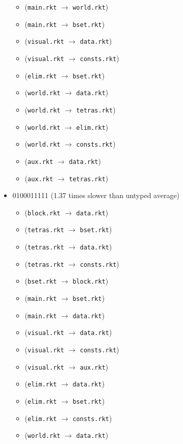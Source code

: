 \documentclass{article}
\newcommand{\mono}[1]{\texttt{#1}}
\begin{document}
\begin{itemize}
\begin{itemize}
  \item (\mono{main.rkt} $\rightarrow$ \mono{world.rkt})
  \item (\mono{main.rkt} $\rightarrow$ \mono{bset.rkt})
  \item (\mono{visual.rkt} $\rightarrow$ \mono{data.rkt})
  \item (\mono{visual.rkt} $\rightarrow$ \mono{consts.rkt})
  \item (\mono{elim.rkt} $\rightarrow$ \mono{bset.rkt})
  \item (\mono{world.rkt} $\rightarrow$ \mono{data.rkt})
  \item (\mono{world.rkt} $\rightarrow$ \mono{tetras.rkt})
  \item (\mono{world.rkt} $\rightarrow$ \mono{elim.rkt})
  \item (\mono{world.rkt} $\rightarrow$ \mono{consts.rkt})
  \item (\mono{aux.rkt} $\rightarrow$ \mono{data.rkt})
  \item (\mono{aux.rkt} $\rightarrow$ \mono{tetras.rkt})
  \end{itemize}
\item 0100011111 (1.37 times slower than untyped average)
  \begin{itemize}
  \item (\mono{block.rkt} $\rightarrow$ \mono{data.rkt})
  \item (\mono{tetras.rkt} $\rightarrow$ \mono{bset.rkt})
  \item (\mono{tetras.rkt} $\rightarrow$ \mono{data.rkt})
  \item (\mono{tetras.rkt} $\rightarrow$ \mono{consts.rkt})
  \item (\mono{bset.rkt} $\rightarrow$ \mono{block.rkt})
  \item (\mono{main.rkt} $\rightarrow$ \mono{bset.rkt})
  \item (\mono{main.rkt} $\rightarrow$ \mono{data.rkt})
  \item (\mono{visual.rkt} $\rightarrow$ \mono{data.rkt})
  \item (\mono{visual.rkt} $\rightarrow$ \mono{consts.rkt})
  \item (\mono{visual.rkt} $\rightarrow$ \mono{aux.rkt})
  \item (\mono{elim.rkt} $\rightarrow$ \mono{data.rkt})
  \item (\mono{elim.rkt} $\rightarrow$ \mono{bset.rkt})
  \item (\mono{elim.rkt} $\rightarrow$ \mono{consts.rkt})
  \item (\mono{world.rkt} $\rightarrow$ \mono{data.rkt})

\end{itemize}
\end{itemize}
\end{document}
